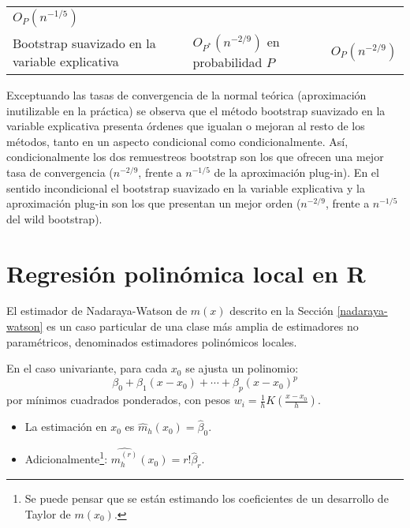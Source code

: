 \documentclass[]{book}
\theoremstyle{break}
\theoremstyle{definition}
\theoremstyle{definition}
\theoremstyle{definition}
\theoremstyle{remark}
\begin{document}
\begin{longtable}[]{@{}lll@{}}
\begin{minipage}[t]{0.29\columnwidth}
\(O_{P}\left(n^{-1/5}\right)\)\strut
\end{minipage}\tabularnewline
\begin{minipage}[t]{0.25\columnwidth}\raggedright\strut
Bootstrap suavizado en la variable explicativa\strut
\end{minipage} & \begin{minipage}[t]{0.37\columnwidth}\raggedright\strut
\(O_{P^{\ast}}\left( n^{-2/9}\right)\) en probabilidad \(P\)\strut
\end{minipage} & \begin{minipage}[t]{0.29\columnwidth}\raggedright\strut
\(O_{P}\left(n^{-2/9}\right)\)\strut
\end{minipage}\tabularnewline
\bottomrule
\end{longtable}

Exceptuando las tasas de convergencia de la normal teórica (aproximación
inutilizable en la práctica) se observa que el método bootstrap
suavizado en la variable explicativa presenta órdenes que igualan o
mejoran al resto de los métodos, tanto en un aspecto condicional como
condicionalmente. Así, condicionalmente los dos remuestreos bootstrap
son los que ofrecen una mejor tasa de convergencia (\(n^{-2/9}\), frente
a \(n^{-1/5}\) de la aproximación plug-in). En el sentido incondicional
el bootstrap suavizado en la variable explicativa y la aproximación
plug-in son los que presentan un mejor orden (\(n^{-2/9}\), frente a
\(n^{-1/5}\) del wild bootstrap).

\section{Regresión polinómica local en R}\label{locpol-r}

El estimador de Nadaraya-Watson de \(m(x)\) descrito en la Sección
\ref{nadaraya-watson} es un caso particular de una clase más amplia de
estimadores no paramétricos, denominados estimadores polinómicos
locales.

En el caso univariante, para cada \(x_0\) se ajusta un polinomio:
\[\beta_0+\beta_{1}\left(x - x_0\right) + \cdots 
+ \beta_{p}\left( x-x_0\right)^{p}\] por mínimos cuadrados ponderados,
con pesos \(w_{i} = \frac{1}{h}K\left(\frac{x-x_0}{h}\right)\).

\begin{itemize}
\item
  La estimación en \(x_0\) es \(\hat{m}_{h}(x_0)=\hat{\beta}_0\).
\item
  Adicionalmente\footnote{Se puede pensar que se están estimando los
    coeficientes de un desarrollo de Taylor de \(m(x_0)\).}:
  \(\widehat{m_{h}^{(r)}}(x_0) = r!\hat{\beta}_{r}\).
\end{itemize}
\end{document}
